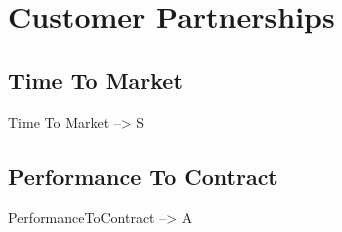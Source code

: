 \chapter{Customer Partnerships}
\label{cap:customerpartnerships}


\section{Time To Market}
Time To Market --> S

\section{Performance To Contract}
PerformanceToContract --> A